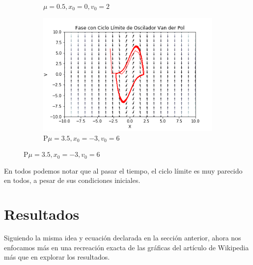 \documentclass[a4paper]{article}
\begin{document}
\begin{figure}[ht!]
\begin{subfigure}{0.5\textwidth}
  \caption{$\mu = 0.5, x_0 = 0, v_0 = 2$}
\end{subfigure}
\begin{subfigure}{0.5\textwidth}
  \centering
  \includegraphics[width=\linewidth]{VP_Ex5.png}
  \caption{P$\mu = 3.5, x_0 = -3, v_0 = 6$}
\end{subfigure}
\end{figure}

En todos podemos notar que al pasar el tiempo, el ciclo límite es muy parecido en todos, a pesar de sus condiciones iniciales.


\section{Resultados}
Siguiendo la misma idea y ecuación declarada en la sección anterior, ahora nos enfocamos más en una recreación exacta de las gráficas del artículo de Wikipedia más que en explorar los resultados.
\end{document}
